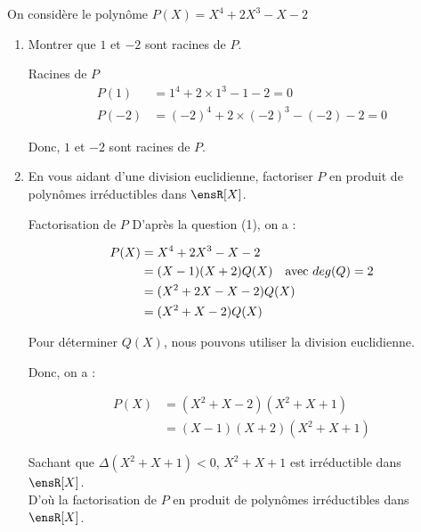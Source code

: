 \noindent On considère le polynôme $P(X) = X^4 + 2X^3 - X - 2$

\begin{enumerate}
    \item Montrer que $1$ et $-2$ sont racines de $P$.

    \begin{theorem}[black]{Racines de $P$}
        \begin{align*}
            P(1) &= 1^4 + 2 \times 1^3 - 1 - 2 = 0 \\
            P(-2) &= (-2)^4 + 2 \times (-2)^3 - (-2) - 2 = 0
        \end{align*}

        \noindent Donc, $1$ et $-2$ sont racines de $P$.
    \end{theorem}
    
    \item En vous aidant d'une division euclidienne, factoriser $P$ en produit de polynômes irréductibles dans $\ensR[X]$.

    \begin{theorem}[black]{Factorisation de $P$}
        D'après la question (1), on a :

        \begin{align*}
            P(X) &= X^4 + 2X^3 - X - 2 \\
            &= (X - 1)(X + 2)Q(X) \hspace{10px} \text{avec } deg(Q) = 2 \\
            &= (X^2 + 2X - X - 2)Q(X) \\
            &= (X^2 + X - 2)Q(X)
        \end{align*}

        \noindent Pour déterminer $Q(X)$, nous pouvons utiliser la division euclidienne.

        \begin{center}
        \end{center}

        \noindent Donc, on a :

        \begin{align*}
            P(X) &= (X^2 + X - 2)(X^2 + X + 1) \\
            &= (X - 1)(X + 2)(X^2 + X + 1)
        \end{align*}

        Sachant que $\Delta(X^2 + X + 1) < 0$, $X^2 + X + 1$ est irréductible dans $\ensR[X]$. \\
        D'où la factorisation de $P$ en produit de polynômes irréductibles dans $\ensR[X]$.
    \end{theorem}
\end{enumerate}